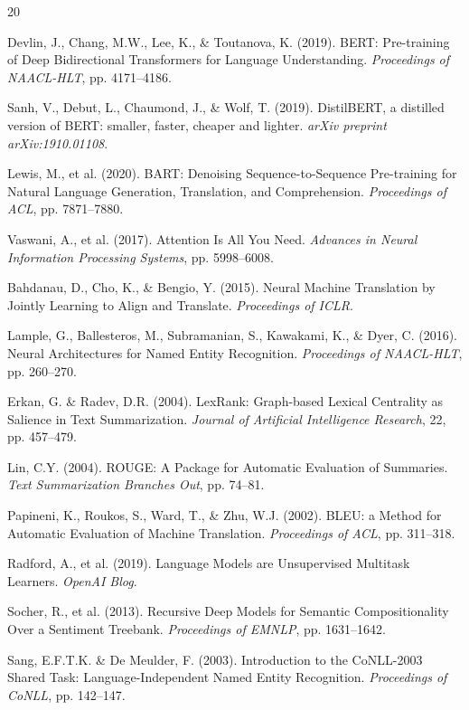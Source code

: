 \documentclass[12pt, a4paper]{article}
\begin{document}

\begin{thebibliography}{20}

Devlin, J., Chang, M.W., Lee, K., \& Toutanova, K. (2019).
BERT: Pre-training of Deep Bidirectional Transformers for Language Understanding.
\textit{Proceedings of NAACL-HLT}, pp. 4171--4186.

Sanh, V., Debut, L., Chaumond, J., \& Wolf, T. (2019).
DistilBERT, a distilled version of BERT: smaller, faster, cheaper and lighter.
\textit{arXiv preprint arXiv:1910.01108}.

Lewis, M., et al. (2020).
BART: Denoising Sequence-to-Sequence Pre-training for Natural Language Generation, Translation, and Comprehension.
\textit{Proceedings of ACL}, pp. 7871--7880.

Vaswani, A., et al. (2017).
Attention Is All You Need.
\textit{Advances in Neural Information Processing Systems}, pp. 5998--6008.

Bahdanau, D., Cho, K., \& Bengio, Y. (2015).
Neural Machine Translation by Jointly Learning to Align and Translate.
\textit{Proceedings of ICLR}.

Lample, G., Ballesteros, M., Subramanian, S., Kawakami, K., \& Dyer, C. (2016).
Neural Architectures for Named Entity Recognition.
\textit{Proceedings of NAACL-HLT}, pp. 260--270.

Erkan, G. \& Radev, D.R. (2004).
LexRank: Graph-based Lexical Centrality as Salience in Text Summarization.
\textit{Journal of Artificial Intelligence Research}, 22, pp. 457--479.

Lin, C.Y. (2004).
ROUGE: A Package for Automatic Evaluation of Summaries.
\textit{Text Summarization Branches Out}, pp. 74--81.

Papineni, K., Roukos, S., Ward, T., \& Zhu, W.J. (2002).
BLEU: a Method for Automatic Evaluation of Machine Translation.
\textit{Proceedings of ACL}, pp. 311--318.

Radford, A., et al. (2019).
Language Models are Unsupervised Multitask Learners.
\textit{OpenAI Blog}.

Socher, R., et al. (2013).
Recursive Deep Models for Semantic Compositionality Over a Sentiment Treebank.
\textit{Proceedings of EMNLP}, pp. 1631--1642.

Sang, E.F.T.K. \& De Meulder, F. (2003).
Introduction to the CoNLL-2003 Shared Task: Language-Independent Named Entity Recognition.
\textit{Proceedings of CoNLL}, pp. 142--147.

\end{thebibliography}
\end{document}
